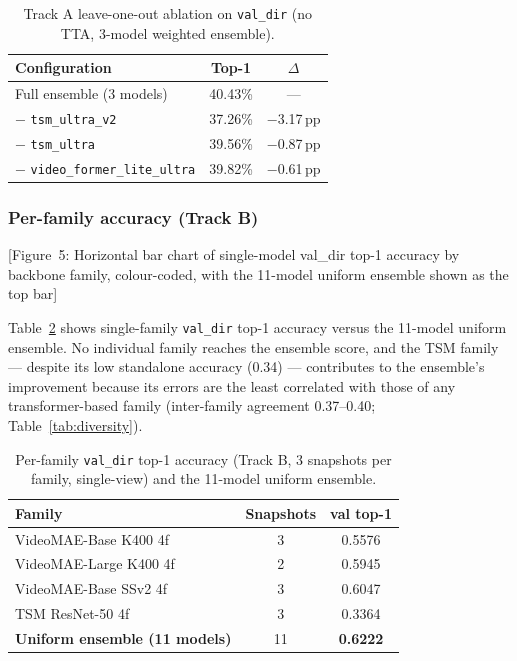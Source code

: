 \documentclass[10pt,twocolumn,letterpaper]{article}
\newcommand{\pp}{\,pp}
\begin{document}
\begin{table}[!t]
\centering
\caption{Track A leave-one-out ablation on \texttt{val\_dir}
  (no TTA, 3-model weighted ensemble).}
\label{tab:trackA_ablation}
\small
\setlength{\tabcolsep}{3pt}
\begin{tabular}{lcc}
\toprule
\textbf{Configuration} & \textbf{Top-1} & \textbf{$\Delta$}\\
\midrule
Full ensemble (3 models) & 40.43\% & —\\
$-$ \texttt{tsm\_ultra\_v2} & 37.26\% & $-$3.17\pp\\
$-$ \texttt{tsm\_ultra} & 39.56\% & $-$0.87\pp\\
$-$ \texttt{video\_former\_lite\_ultra} & 39.82\% & $-$0.61\pp\\
\bottomrule
\end{tabular}
\end{table}

\subsubsection{Per-family accuracy (Track B)}

[Figure~5: Horizontal bar chart of single-model val\_dir top-1 accuracy by
backbone family, colour-coded, with the 11-model uniform ensemble shown
as the top bar]

Table~\ref{tab:family_acc} shows single-family \texttt{val\_dir} top-1
accuracy versus the 11-model uniform ensemble.  No individual family
reaches the ensemble score, and the TSM family --- despite its low
standalone accuracy (0.34) --- contributes to the ensemble's improvement
because its errors are the least correlated with those of any
transformer-based family (inter-family agreement 0.37–0.40;
Table~\ref{tab:diversity}).

\begin{table}[!t]
\centering
\caption{Per-family \texttt{val\_dir} top-1 accuracy (Track B, 3 snapshots
  per family, single-view) and the 11-model uniform ensemble.}
\label{tab:family_acc}
\small
\setlength{\tabcolsep}{4pt}
\begin{tabular}{lcc}
\toprule
\textbf{Family} & \textbf{Snapshots} & \textbf{val top-1}\\
\midrule
VideoMAE-Base K400 4f & 3 & 0.5576\\
VideoMAE-Large K400 4f & 2 & 0.5945\\
VideoMAE-Base SSv2 4f & 3 & 0.6047\\
TSM ResNet-50 4f & 3 & 0.3364\\
\midrule
\textbf{Uniform ensemble (11 models)} & 11 & \textbf{0.6222}\\
\bottomrule
\end{tabular}
\end{table}
\end{document}
